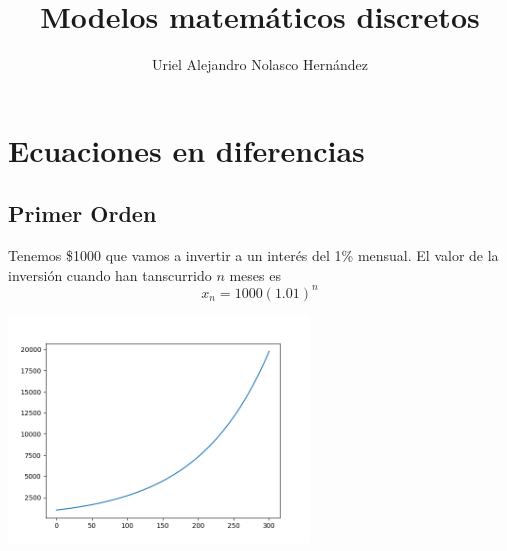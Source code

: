 \documentclass{article}
\title{Modelos matemáticos discretos}
\author{Uriel Alejandro Nolasco Hernández}
\begin{document}
	\maketitle
	\section{Ecuaciones en diferencias}

	\subsection{Primer Orden}
	Tenemos \$1000 que vamos a invertir a un interés del 1\% mensual.
El valor de la inversión cuando han tanscurrido $n$ meses es $$x_n=1000(1.01)^n$$

\begin{center}
\includegraphics[width=8cm]{Figure_1}	
\end{center}
\end{document}
